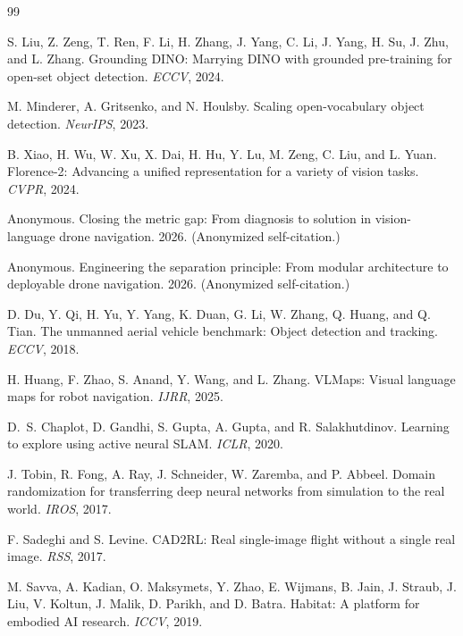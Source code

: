 \documentclass{article}
\begin{document}
{\small


\begin{thebibliography}{99}

S. Liu, Z. Zeng, T. Ren, F. Li, H. Zhang, J. Yang, C. Li, J. Yang, H. Su, J. Zhu, and L. Zhang.
Grounding {DINO}: Marrying {DINO} with grounded pre-training for open-set object detection.
\textit{ECCV}, 2024.

M. Minderer, A. Gritsenko, and N. Houlsby.
Scaling open-vocabulary object detection.
\textit{NeurIPS}, 2023.

B. Xiao, H. Wu, W. Xu, X. Dai, H. Hu, Y. Lu, M. Zeng, C. Liu, and L. Yuan.
Florence-2: Advancing a unified representation for a variety of vision tasks.
\textit{CVPR}, 2024.

Anonymous.
Closing the metric gap: From diagnosis to solution in vision-language drone navigation.
2026. (Anonymized self-citation.)

Anonymous.
Engineering the separation principle: From modular architecture to deployable drone navigation.
2026. (Anonymized self-citation.)

D. Du, Y. Qi, H. Yu, Y. Yang, K. Duan, G. Li, W. Zhang, Q. Huang, and Q. Tian.
The unmanned aerial vehicle benchmark: Object detection and tracking.
\textit{ECCV}, 2018.

H. Huang, F. Zhao, S. Anand, Y. Wang, and L. Zhang.
{VLMaps}: Visual language maps for robot navigation.
\textit{IJRR}, 2025.

D.~S. Chaplot, D. Gandhi, S. Gupta, A. Gupta, and R. Salakhutdinov.
Learning to explore using active neural {SLAM}.
\textit{ICLR}, 2020.

J. Tobin, R. Fong, A. Ray, J. Schneider, W. Zaremba, and P. Abbeel.
Domain randomization for transferring deep neural networks from simulation to the real world.
\textit{IROS}, 2017.

F. Sadeghi and S. Levine.
{CAD2RL}: Real single-image flight without a single real image.
\textit{RSS}, 2017.

M. Savva, A. Kadian, O. Maksymets, Y. Zhao, E. Wijmans, B. Jain, J. Straub, J. Liu, V. Koltun, J. Malik, D. Parikh, and D. Batra.
Habitat: A platform for embodied {AI} research.
\textit{ICCV}, 2019.


\end{thebibliography}}
\end{document}
